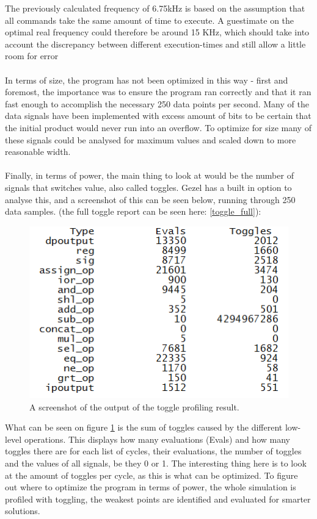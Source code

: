 \documentclass[12pt,a4paper]{article}
\begin{document}
	The previously calculated frequency of 6.75kHz is based on the assumption that all commands take the same amount of time to execute. A guestimate on the optimal real frequency could therefore be around 15 KHz, which should take into account the discrepancy between different execution-times and still allow a little room for error\\
	\\
	In terms of size, the program has not been optimized in this way - first and foremost, the importance was to ensure the program ran correctly and that it ran fast enough to accomplish the necessary 250 data points per second. Many of the data signals have been implemented with excess amount of bits to be certain that the initial product would never run into an overflow. To optimize for size many of these signals could be analysed for maximum values and scaled down to more reasonable width.\\
	\\
	Finally, in terms of power, the main thing to look at would be the number of signals that switches value, also called toggles. Gezel has a built in option to analyse this, and a screenshot of this can be seen below, running through 250 data samples. (the full toggle report can be seen here: \ref{toggle_full}):\\
	\begin{figure}[h!]
		\centering
			\includegraphics[width=1\textwidth]{Screenshots/Screenshot_profiling.png}
		\caption{A screenshot of the output of the toggle profiling result.}
		\label{toggle}
	\end{figure}
	
	What can be seen on figure \ref{toggle} is the sum of toggles caused by the different low-level operations. This displays how many evaluations (Evals) and how many toggles there are for each 
	 list of cycles, their evaluations, the number of toggles and the values of all signals, be they 0 or 1. The interesting thing here is to look at the amount of toggles per cycle, as this is what can be optimized. To figure out where to optimize the program in terms of power, the whole simulation is profiled with toggling, the weakest points are identified and evaluated for smarter solutions.\\
\end{document}
